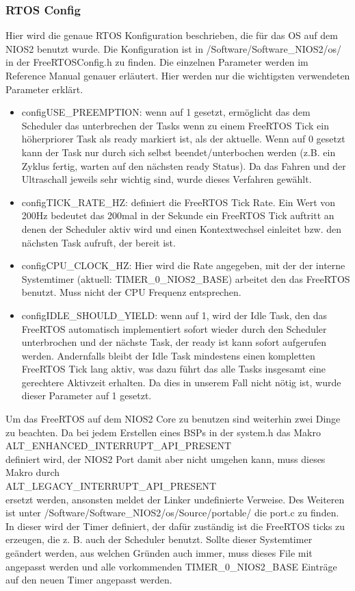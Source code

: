  \subsubsection{RTOS Config}
Hier wird die genaue RTOS Konfiguration beschrieben, die für das OS auf dem NIOS2 benutzt wurde. Die Konfiguration ist in /Software/Software\_NIOS2/os/ in der FreeRTOSConfig.h zu finden. Die einzelnen Parameter werden im Reference Manual genauer erläutert. Hier werden nur die wichtigsten verwendeten Parameter erklärt.
\begin{itemize}
 \item configUSE\_PREEMPTION: wenn auf 1 gesetzt, ermöglicht das dem Scheduler das unterbrechen der Tasks wenn zu einem FreeRTOS Tick ein höherpriorer Task als ready markiert ist, als der aktuelle. Wenn auf 0 gesetzt kann der Task nur durch sich selbst beendet/unterbochen werden (z.B. ein Zyklus fertig, warten auf den nächsten ready Status). Da das Fahren und der Ultraschall jeweils sehr wichtig sind, wurde dieses Verfahren gewählt.
 \item configTICK\_RATE\_HZ: definiert die FreeRTOS Tick Rate. Ein Wert von 200Hz bedeutet das 200mal in der Sekunde ein FreeRTOS Tick auftritt an denen der Scheduler aktiv wird und einen Kontextwechsel einleitet bzw. den nächsten Task aufruft, der bereit ist.
 \item configCPU\_CLOCK\_HZ: Hier wird die Rate angegeben, mit der der interne Systemtimer (aktuell: TIMER\_0\_NIOS2\_BASE) arbeitet den das FreeRTOS benutzt. Muss nicht der CPU Frequenz entsprechen.
 \item configIDLE\_SHOULD\_YIELD: wenn auf 1, wird der Idle Task, den das FreeRTOS automatisch implementiert sofort wieder durch den Scheduler unterbrochen und der nächste Task, der ready ist kann sofort aufgerufen werden. Andernfalls bleibt der Idle Task mindestens einen kompletten FreeRTOS Tick lang aktiv, was dazu führt das alle Tasks insgesamt eine gerechtere Aktivzeit erhalten. Da dies in unserem Fall nicht nötig ist, wurde dieser Parameter auf 1 gesetzt.
\end{itemize}
Um das FreeRTOS auf dem NIOS2 Core zu benutzen sind weiterhin zwei Dinge zu beachten. Da bei jedem Erstellen eines BSPs in der system.h das Makro\\ ALT\_ENHANCED\_INTERRUPT\_API\_PRESENT\\ definiert wird, der NIOS2 Port damit aber nicht umgehen kann, muss dieses Makro durch\\ ALT\_LEGACY\_INTERRUPT\_API\_PRESENT\\ ersetzt werden, ansonsten meldet der Linker undefinierte Verweise. Des Weiteren ist unter /Software/Software\_NIOS2/os/Source/portable/ die port.c zu finden. In dieser wird der Timer definiert, der dafür zuständig ist die FreeRTOS ticks zu erzeugen, die z. B. auch der Scheduler benutzt. Sollte dieser Systemtimer geändert werden, aus welchen Gründen auch immer, muss dieses File mit angepasst werden und alle vorkommenden TIMER\_0\_NIOS2\_BASE Einträge auf den neuen Timer angepasst werden.

